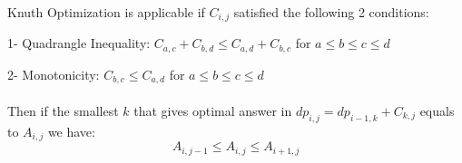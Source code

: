 Knuth Optimization is applicable if $C_{i,j}$ satisfied the following 2 conditions:

1- Quadrangle Inequality: $C_{a,c} + C_{b,d} \leq C_{a,d} + C_{b,c}$ for $a \leq b \leq c \leq d$

2- Monotonicity: $C_{b,c} \leq C_{a,d}$ for $a \leq b \leq c \leq d$
\\
\\
Then if the smallest $k$ that gives optimal answer in $dp_{i,j} = dp_{i-1,k} + C_{k,j}$ equals to $A_{i,j}$ we have:
$$A_{i,j-1} \leq A_{i,j} \leq A_{i+1,j}$$
\hline
